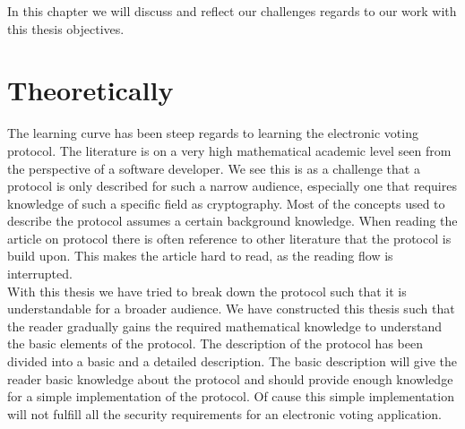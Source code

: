 In this chapter we will discuss and reflect our challenges regards to our work with this thesis objectives. 



\section{Theoretically}
The learning curve has been steep regards to learning the electronic voting protocol. The literature is on a very high mathematical academic level seen from the perspective of a software developer. We see this is as a challenge that a protocol is only described for such a narrow audience, especially  one that requires knowledge of such a specific field as cryptography. Most of the concepts used to describe the protocol assumes a certain background knowledge. When reading the article on protocol there is often reference to other literature that the protocol is build upon. This makes the article hard to read, as the reading flow is interrupted. \\

\noindent
With this thesis we have tried to break down the protocol such that it is understandable for a broader audience. We have constructed this thesis such that the reader gradually gains the required mathematical knowledge to understand the basic elements of the protocol. The description of the protocol has been divided into a basic and a detailed description. The basic description will give the reader basic knowledge about the protocol and should provide enough knowledge for a simple implementation of the protocol. Of cause this simple implementation will not fulfill all the security requirements for an electronic voting application.


